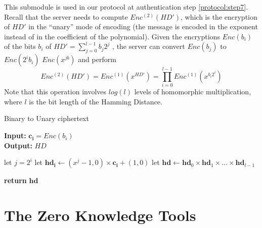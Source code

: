 This submodule is used in our protocol at authentication step
\ref{protocol:step7}. Recall that the server needs to compute $Enc^{(2)}(HD')$,
which is the encryption of $HD'$ in the ``unary'' mode of encoding (the message is
encoded in the exponent instead of in the coefficient of the polynomial). Given the encryptions $Enc(b_{i})$ of the bits $b_{i}$ of $HD' = \sum_{j = 0}^{l -1} b_{j}2^{j}$
, the server can convert $Enc(b_{j})$ to $Enc(2^{i}b_{i})$
$Enc(x^{jb})$ and perform
\[
  Enc^{(2)}(HD') = Enc^{(1)}(x^{HD'}) = \prod_{i=0}^{l-1}Enc^{(1)}(x^{b_i2^i})
\]
Note that this operation involves $log(l)$ levels of homomorphic multiplication, where
$l$ is the bit length of the Hamming Distance.
\begin{algorithm}
  \caption{Binary to Unary ciphertext}\label{alg:ToUnary}
    \hspace*{\algorithmicindent} \textbf{Input:} $\mathbf{c_{i}} = Enc(b_{i})$ \\
  \hspace*{\algorithmicindent} \textbf{Output:} $HD$
  \begin{algorithmic}[1]
    \State let $j = 2^{i}$
    \State let $\mathbf{hd_i} \gets (x^j - 1,0)\times \mathbf{c_i} + (1,0)$
    \EndFor
    \State let $\mathbf{hd} \gets \mathbf{hd}_0 \times \mathbf{hd}_1 \times \dots
    \times \mathbf{hd}_{l-1}$


    \State \textbf{return} $\mathbf{hd}$
    \EndProcedure
  \end{algorithmic}
\end{algorithm}

\section{The Zero Knowledge Tools}
\label{sec:zkptools}

